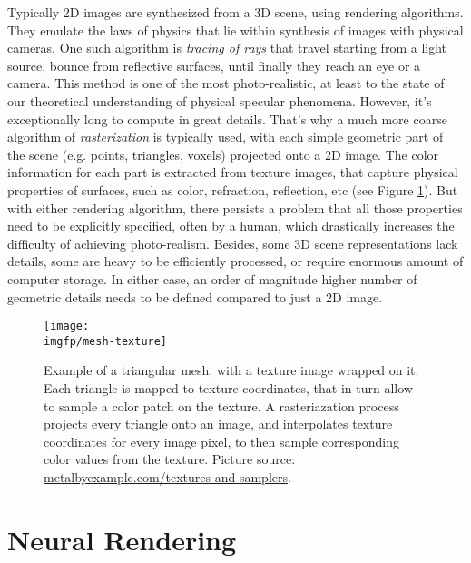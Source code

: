 Typically 2D images are synthesized from a 3D scene, using rendering algorithms. They emulate the laws of physics that lie within synthesis of images with physical cameras. One such algorithm is \textit{tracing of rays} that travel starting from a light source, bounce from reflective surfaces, until finally they reach an eye or a camera. This method is one of the most photo-realistic, at least to the state of our theoretical understanding of physical specular phenomena. However, it's exceptionally long to compute in great details. That's why a much more coarse algorithm of \textit{rasterization} is typically used, with each simple geometric part of the scene (e.g. points, triangles, voxels) projected onto a 2D image. The color information for each part is extracted from texture images, that capture physical properties of surfaces, such as color, refraction, reflection, etc (see Figure \ref{intro:fig:mesh-texture}). But with either rendering algorithm, there persists a problem that all those properties need to be explicitly specified, often by a human, which drastically increases the difficulty of achieving photo-realism. Besides, some 3D scene representations lack details, some are heavy to be efficiently processed, or require enormous amount of computer storage. In either case, an order of magnitude higher number of geometric details needs to be defined compared to just a 2D image. 

\begin{figure}[h!]
	\centering
	\texttt{[image: \\imgfp/mesh-texture]}
	\caption{Example of a triangular mesh, with a texture image wrapped on it. Each triangle is mapped to texture coordinates, that in turn allow to sample a color patch on the texture. A rasteriazation process projects every triangle onto an image, and interpolates texture coordinates for every image pixel, to then sample corresponding color values from the texture. Picture source: \href{https://metalbyexample.com/textures-and-samplers/}{metalbyexample.com/textures-and-samplers}.}
	\label{intro:fig:mesh-texture}
\end{figure}


\section{Neural Rendering}\label{intro:nrender}

